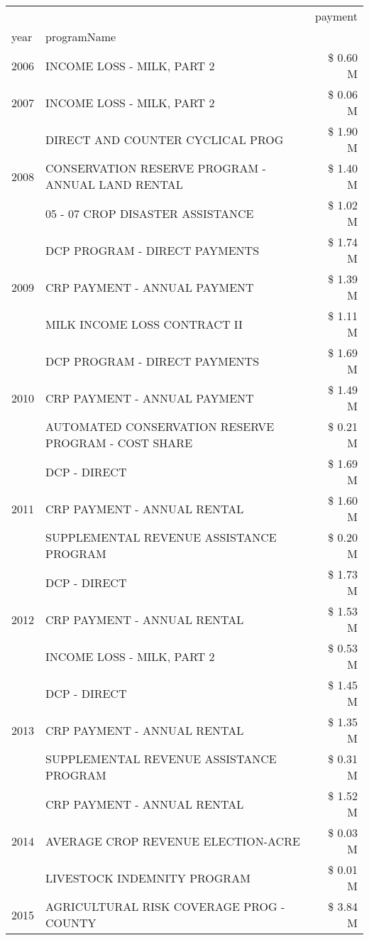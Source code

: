 \begin{tabular}{llr}
\toprule
 &  & payment \\
year & programName &  \\
\midrule
2006 & INCOME LOSS - MILK, PART 2 & \$ 0.60 M \\
\cline{1-3}
2007 & INCOME LOSS - MILK, PART 2 & \$ 0.06 M \\
\cline{1-3}
\multirow[t]{3}{*}{2008} & DIRECT AND COUNTER CYCLICAL PROG & \$ 1.90 M \\
 & CONSERVATION RESERVE PROGRAM - ANNUAL LAND RENTAL & \$ 1.40 M \\
 & 05 - 07 CROP DISASTER ASSISTANCE & \$ 1.02 M \\
\cline{1-3}
\multirow[t]{3}{*}{2009} & DCP PROGRAM - DIRECT PAYMENTS & \$ 1.74 M \\
 & CRP PAYMENT - ANNUAL PAYMENT & \$ 1.39 M \\
 & MILK INCOME LOSS CONTRACT II & \$ 1.11 M \\
\cline{1-3}
\multirow[t]{3}{*}{2010} & DCP PROGRAM - DIRECT PAYMENTS & \$ 1.69 M \\
 & CRP PAYMENT - ANNUAL PAYMENT & \$ 1.49 M \\
 & AUTOMATED CONSERVATION RESERVE PROGRAM - COST SHARE & \$ 0.21 M \\
\cline{1-3}
\multirow[t]{3}{*}{2011} & DCP - DIRECT & \$ 1.69 M \\
 & CRP PAYMENT - ANNUAL RENTAL & \$ 1.60 M \\
 & SUPPLEMENTAL REVENUE ASSISTANCE PROGRAM & \$ 0.20 M \\
\cline{1-3}
\multirow[t]{3}{*}{2012} & DCP - DIRECT & \$ 1.73 M \\
 & CRP PAYMENT - ANNUAL RENTAL & \$ 1.53 M \\
 & INCOME LOSS - MILK, PART 2 & \$ 0.53 M \\
\cline{1-3}
\multirow[t]{3}{*}{2013} & DCP - DIRECT & \$ 1.45 M \\
 & CRP PAYMENT - ANNUAL RENTAL & \$ 1.35 M \\
 & SUPPLEMENTAL REVENUE ASSISTANCE PROGRAM & \$ 0.31 M \\
\cline{1-3}
\multirow[t]{3}{*}{2014} & CRP PAYMENT - ANNUAL RENTAL & \$ 1.52 M \\
 & AVERAGE CROP REVENUE ELECTION-ACRE & \$ 0.03 M \\
 & LIVESTOCK INDEMNITY PROGRAM & \$ 0.01 M \\
\cline{1-3}
\multirow[t]{3}{*}{2015} & AGRICULTURAL RISK COVERAGE PROG - COUNTY & \$ 3.84 M \\

\end{tabular}
